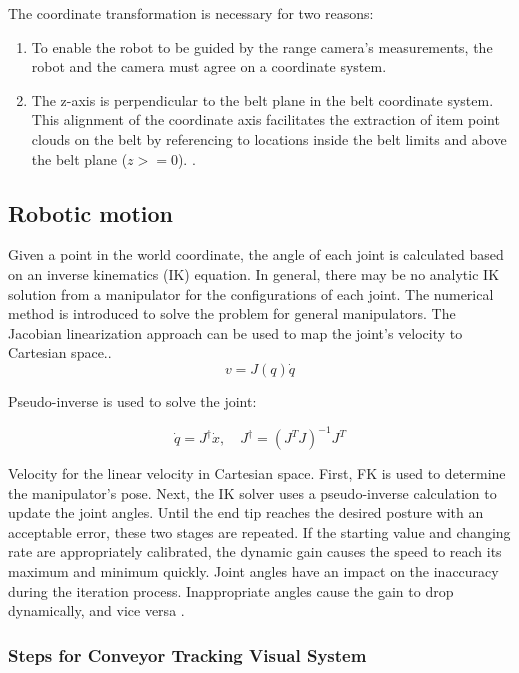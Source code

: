 \documentclass[12pt]{article}
\begin{document}
 The coordinate transformation is necessary for two reasons:\cite{ref5}
 \begin{enumerate}
     \item  To enable the robot to be guided by the range camera's measurements, the robot and the camera must agree on a coordinate system\cite{ref5}.

    \item The z-axis is perpendicular to the belt plane in the belt coordinate system.  This alignment of the coordinate axis facilitates the extraction of item point clouds on the belt by referencing to locations inside the belt limits and above the belt plane ($z >= 0$). \cite{ref5}.
 \end{enumerate}
 \subsection{Robotic motion}
Given a point in the world coordinate, the angle of each joint is calculated based on an inverse kinematics (IK) equation. In general, there may be no analytic IK solution from a manipulator for the configurations of each joint. The numerical method is introduced to solve the problem for
general manipulators. The Jacobian linearization approach can be used to map the joint's velocity to Cartesian space.\cite{ref19}.
\\

\[
v = J(q) \dot{q} 
\]

Pseudo-inverse is used to solve the joint:\cite{ref19}


\[
\dot{q} = J^\dagger \dot{x}, \quad J^\dagger = (J^T J)^{-1} J^T
\]

Velocity for the linear velocity in Cartesian space. First, FK is used to determine the manipulator's pose. Next, the IK solver uses a pseudo-inverse calculation to update the joint angles. Until the end tip reaches the desired posture with an acceptable error, these two stages are repeated. If the starting value and changing rate are appropriately calibrated, the dynamic gain causes the speed to reach its maximum and minimum quickly. Joint angles have an impact on the inaccuracy during the iteration process. Inappropriate angles cause the gain to drop dynamically, and vice versa \cite{ref19}.

\subsubsection{Steps for Conveyor Tracking Visual System}
\end{document}
